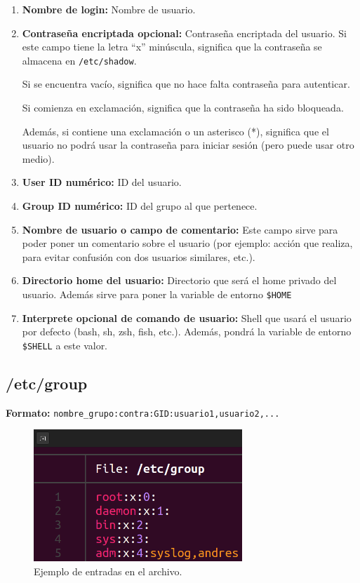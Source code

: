 \documentclass{article}
\begin{document}
\begin{enumerate}
    \item \textbf{Nombre de login: }Nombre de usuario.
    \item \textbf{Contraseña encriptada opcional: }Contraseña encriptada del usuario.
    Si este campo tiene la letra ``x'' minúscula, significa que la contraseña se almacena en \verb|/etc/shadow|.

    Si se encuentra vacío, significa que no hace falta contraseña para autenticar.

    Si comienza en exclamación, significa que la contraseña ha sido bloqueada.

    Además, si contiene una exclamación o un asterisco (*), significa que el usuario no podrá usar la contraseña para iniciar sesión (pero puede usar otro medio).

    \item \textbf{User ID numérico: }ID del usuario.
    \item \textbf{Group ID numérico: }ID del grupo al que pertenece.
    \item \textbf{Nombre de usuario o campo de comentario: }Este campo sirve para poder poner un comentario sobre el usuario (por ejemplo: acción que realiza, para evitar confusión con dos usuarios similares, etc.).
    \item \textbf{Directorio home del usuario: }Directorio que será el home privado del usuario. Además sirve para poner la variable de entorno \verb|$HOME|
    \item \textbf{Interprete opcional de comando de usuario: }Shell que usará el usuario por defecto (bash, sh, zsh, fish, etc.). Además, pondrá la variable de entorno \verb|$SHELL| a este valor.
\end{enumerate}

\newpage

\subsection*{/etc/group}
\textbf{Formato: }\verb|nombre_grupo:contra:GID:usuario1,usuario2,...|

\begin{figure}[H]
    \centering
    \includegraphics[width=0.7\textwidth]{imagenes/groupfile.png}
    \caption{Ejemplo de entradas en el archivo.}    
\end{figure}
\end{document}
